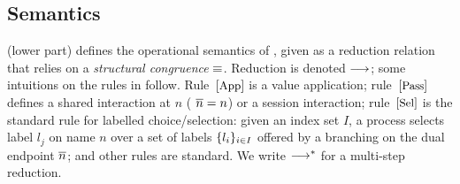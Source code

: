 \smallskip

\subsection{Semantics}
	 (lower part) defines the operational semantics 
of \HOp, given as
a reduction relation that relies 
on 
a \emph{structural congruence} $\equiv$. %
Reduction is denoted $\longrightarrow$; some intuitions on the rules in  %
follow.
Rule~${{[\textrm{\small App}]}}$ is a value application; 
rule~${{[\textrm{\small Pass}]}}$ defines a shared interaction at $n$ 
( $\overline{n}=n$) or a session interaction;  
rule~${{[\textrm{\small Sel}]}}$ is the standard rule for labelled choice/selection:
given an index set $I$, 
a process selects label $l_j$ on name $n$ over a set of
labels $\{l_i\}_{i \in I}$ offered by a branching 
on the dual endpoint $\overline{n}$; and other rules are standard.
We write $\longrightarrow^\ast$ for a multi-step reduction. 


